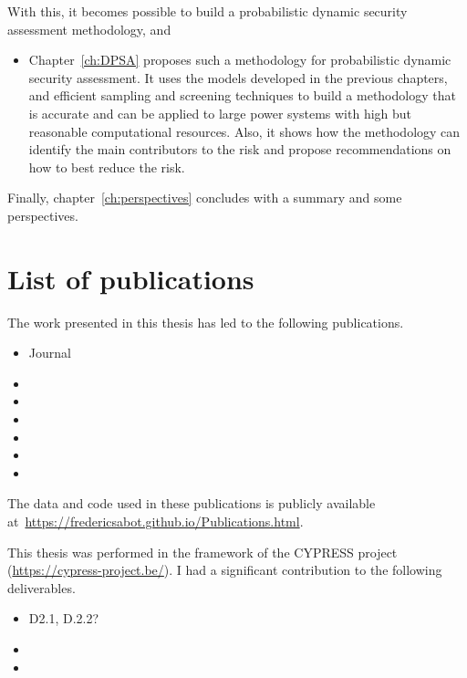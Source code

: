 With this, it becomes possible to build a probabilistic dynamic security assessment methodology, and

\begin{itemize}
    \item Chapter~\ref{ch:DPSA} proposes such a methodology for probabilistic dynamic security assessment. It uses the models developed in the previous chapters, and efficient sampling and screening techniques to build a methodology that is accurate and can be applied to large power systems with high but reasonable computational resources. Also, it shows how the methodology can identify the main contributors to the risk and propose recommendations on how to best reduce the risk.
\end{itemize}

Finally, chapter~\ref{ch:perspectives} concludes with a summary and some perspectives.

\section{List of publications}

The work presented in this thesis has led to the following publications.

\begin{itemize}
    \item Journal
    \item {}
    \item {}
    \item {}
    \item {}
    \item {}
    \item {}
\end{itemize}

The data and code used in these publications is publicly available at~\url{https://fredericsabot.github.io/Publications.html}.

This thesis was performed in the framework of the CYPRESS project (\url{https://cypress-project.be/}). I had a significant contribution to the following deliverables.

\begin{itemize}
    \item D2.1, D.2.2?
    \item {}
    \item {}
\end{itemize}

